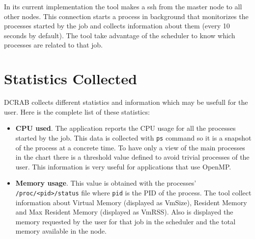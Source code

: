 \documentclass[10pt,a4paper]{report}
\begin{document}
In its current implementation the tool makes a ssh from the master node to all other nodes. This connection starts a process in background that monitorizes the processes started by the job and collects information about them (every 10 seconds by default). The tool take advantage of the scheduler to know which processes are related to that job.

\section{Statistics Collected}

DCRAB collects different statistics and information which may be usefull for the user. Here is the complete list of these statistics:

\begin{itemize}
	\item \textbf{CPU used}. The application reports the CPU usage for all the processes started by the job. This data is collected with \verb+ps+ command so it is a snapshot of the process at a concrete time. To have only a view of the main processes in the chart there is a threshold value defined to avoid trivial processes of the user. This information is very useful for applications that use OpenMP.
	\item \textbf{Memory usage}. This value is obtained with the processes' \verb+/proc/<pid>/status+ file where \verb+pid+ is the PID of the process. The tool collect information about Virtual Memory (displayed as VmSize), Resident Memory and Max Resident Memory (displayed as VmRSS). Also is displayed the memory requested by the user for that job in the scheduler and the total memory available in the node.


\end{itemize}
\end{document}
